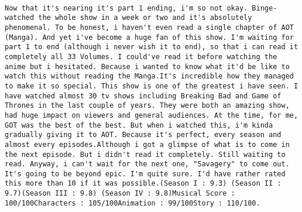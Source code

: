 \documentclass[
]{article}
\begin{document}
\begin{verbatim}
                                                                                                                                                                                                                                                                                                                                                                                                                                                                                                                                                                                                                                                                                                                                                                                                                                                                                                                                                                                                                                                                                                                                                                                                                                                                                                                                                                                                                                                                                                                                                                                                                                                                                                                                                                                              Now that it's nearing it's part 1 ending, i'm so not okay. Binge-watched the whole show in a week or two and it's absolutely phenomenal. To be honest, i haven't even read a single chapter of AOT (Manga). And yet i've become a huge fan of this show. I'm waiting for part 1 to end (although i never wish it to end), so that i can read it completely all 33 Volumes. I could've read it before watching the anime but i hesitated. Because i wanted to know what it'd be like to watch this without reading the Manga.It's incredible how they managed to make it so special. This show is one of the greatest i have seen. I have watched almost 30 tv shows including Breaking Bad and Game of Thrones in the last couple of years. They were both an amazing show, had huge impact on viewers and general audiences. At the time, for me, GOT was the best of the best. But when i watched this, i'm kinda gradually giving it to AOT. Because it's perfect, every season and almost every episodes.Although i got a glimpse of what is to come in the next episode. But i didn't read it completely. Still waiting to read. Anyway, i can't wait for the next one, "Savagery" to come out. It's going to be beyond epic. I'm quite sure. I'd have rather rated this more than 10 if it was possible.(Season I : 9.3) (Season II : 9.7)(Season III : 9.8) (Season IV : 9.8)Musical Score : 100/100Characters : 105/100Animation : 99/100Story : 110/100.
\end{verbatim}
\end{document}
